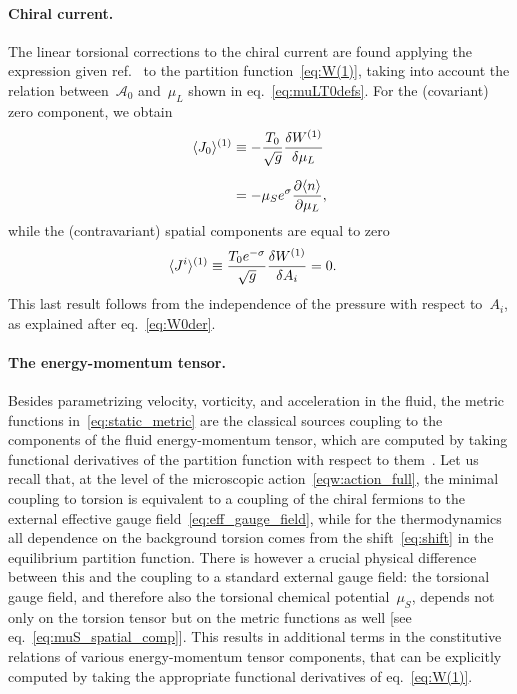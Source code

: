 \documentclass[11pt,a4paper]{article}
\begin{document}
\paragraph{Chiral current.}
The linear torsional corrections to the chiral current are found applying the expression given  
ref.~\cite{Banerjee:2012iz} to the partition function~\eqref{eq:W(1)}, taking into account
the relation between~$\mathcal{A}_{0}$ and~$\mu_{L}$ shown in eq.~\eqref{eq:muLT0defs}.
For the (covariant) zero component, we obtain
\begin{align}
\langle J_{0}\rangle^{(1)}
&\equiv -{T_{0}\over \sqrt{g}}{\delta W^{(1)}\over \delta \mu_{L}} \nonumber \\[0.2cm]
&=-\mu_{S}e^{\sigma}{\partial\langle n\rangle\over \partial\mu_{L}},
\label{eq:J_0_general}
\end{align}
while the (contravariant) spatial components are equal to zero
\begin{align}
\langle J^{i}\rangle^{(1)}
&\equiv{T_{0}e^{-\sigma}\over\sqrt{g}}{\delta W^{(1)}\over \delta A_{i}}=0.
\label{eq:J^i_general}
\end{align}
This last result follows from the independence of the pressure with respect to~$A_{i}$, as explained after eq.~\eqref{eq:W0der}.

\paragraph{The energy-momentum tensor.}
Besides parametrizing velocity, vorticity, and acceleration in the fluid, the metric
functions in~\eqref{eq:static_metric} are the classical sources coupling to the
components of the fluid energy-momentum tensor, which are computed by taking
functional derivatives of the 
partition function with respect to them~\cite{Banerjee:2012iz}. 
Let us recall that, at the level of the microscopic action~\eqref{eqw:action_full}, the minimal 
coupling to
torsion is equivalent to a coupling of the chiral fermions to the external effective gauge 
field~\eqref{eq:eff_gauge_field}, while for the 
thermodynamics all dependence on the background torsion comes from the 
shift~\eqref{eq:shift} in the equilibrium partition function. 
There is however a crucial physical difference between this and the coupling to a standard external gauge field: the 
torsional gauge field,
and therefore also the torsional chemical potential~$\mu_{S}$, depends 
not only on the torsion tensor but on the metric functions as well
[see eq.~\eqref{eq:muS_spatial_comp}]. This results in additional terms in the constitutive relations of various 
energy-momentum tensor components, that
can be explicitly computed by taking the appropriate functional derivatives of eq.~\eqref{eq:W(1)}. 
\end{document}
